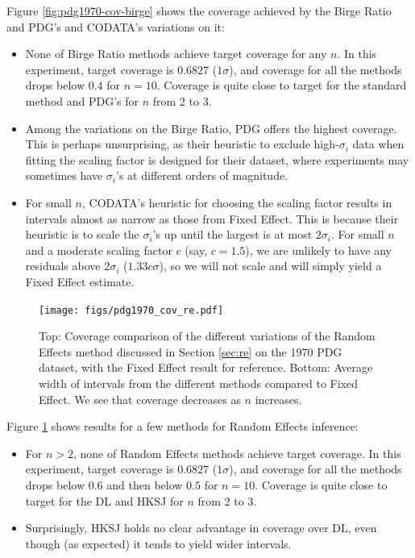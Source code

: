 \documentclass[letterpaper,12pt]{article}
\begin{document}
Figure \ref{fig:pdg1970-cov-birge} shows the coverage achieved by the Birge Ratio and PDG's and CODATA's variations on it:
\begin{itemize}
  \item None of Birge Ratio methods achieve target coverage for any $n$. In this experiment, target coverage is $0.6827$ ($1\sigma$), and coverage for all the methods drops below $0.4$ for $n=10$. Coverage is quite close to target for the standard method and PDG's for $n$ from 2 to 3.
  \item Among the variations on the Birge Ratio, PDG offers the highest coverage. This is perhaps unsurprising, as their heuristic to exclude high-$\sigma_i$ data when fitting the scaling factor is designed for their dataset, where experiments may sometimes have $\sigma_i$'s at different orders of magnitude.
  \item For small $n$, CODATA's heuristic for choosing the scaling factor results in intervals almost as narrow as those from Fixed Effect. This is because their heuristic is to scale the $\sigma_i$'s up until the largest is at most $2\sigma_i$. For small $n$ and a moderate scaling factor $c$ (say, $c=1.5$), we are unlikely to have any residuals above $2\sigma_i$ ($1.33c\sigma$), so we will not scale and will simply yield a Fixed Effect estimate.
\end{itemize}

\begin{figure}[htbp]
  \texttt{[image: figs/pdg1970\_cov\_re.pdf]}
\caption{
Top: Coverage comparison of the different variations of the Random Effects method discussed in Section \ref{sec:re} on the 1970 PDG dataset, with the Fixed Effect result for reference. Bottom: Average width of intervals from the different methods compared to Fixed Effect. We see that coverage decreases as $n$ increases.
}\label{fig:pdg1970-cov-re}
\end{figure}

Figure \ref{fig:pdg1970-cov-re} shows results for a few methods for Random Effects inference:
\begin{itemize}
  \item For $n>2$, none of Random Effects methods achieve target coverage. In this experiment, target coverage is $0.6827$ ($1\sigma$), and coverage for all the methods drops below $0.6$ and then below $0.5$ for $n=10$. Coverage is quite close to target for the DL and HKSJ for $n$ from 2 to 3.
  \item Surprisingly, HKSJ holds no clear advantage in coverage over DL, even though (as expected) it tends to yield wider intervals.
\end{itemize}
\end{document}
